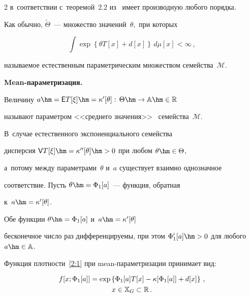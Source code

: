 \begin{multicols}{2}
  в~соответствии с~теоремой~2.2 из~\cite{16-ch} имеет производную любого порядка.





 Как обычно, $\widetilde{\Theta}$~--- множество  значений~$\theta,$ при которых


 \begin{equation*}


 \int\limits \exp \left\{\theta  T[x]+d[x]\right\}\,d\mu[x]<\infty\,,


 \end{equation*}


 называемое естественным параметрическим множеством семейства~$\mathcal{M}$.





\textbf{Mean-параметризация.}


  Величину $a \hm= \Ep T[\xi]\hm=\kappa'[\theta]:\,\Theta\hm\rightarrow \mathbb {A}\hm\in \Rp$


  называют параметром <<среднего значения>>~\cite{15-ch, 16-ch} семейства~$\mathcal{M}$.


    В~случае естественного экспоненциального семейства


  дисперсия $\Vp T[\xi]\hm=\kappa''[\theta]\hm>0$ при любом $\theta\hm\in\Theta$,


  а~потому между параметрами~$\theta$ и~$a$ существует взаимно однозначное


  соответствие. Пусть $\theta\hm=\Phi_1[a]$~--- функция, обратная


  к~$a \hm= \kappa'[\theta]$.


  Обе функции $\theta\hm=\Phi_1[a]$ и~$a \hm= \kappa'[\theta]$ 


  бесконечное число раз дифферен\-ци\-ру\-емы, при этом $\Phi'_1[a] \hm> 0$ для любого $a \hm\in


  \mathbb{A}$.





   Функция плотности~\eqref{2:1} при mean-па\-ра\-мет\-ри\-за\-ции принимает вид:


 \begin{multline}


  f[x;\Phi_1[a]] =


   \exp \left\{ \Phi_1[a]  T[x]


  - \kappa[\Phi_1[a]] + d[x ]\right\}\,,


\\ x\in \mathbb {X}_G \subset \Rp\,.



\end{multline}
\end{multicols}
